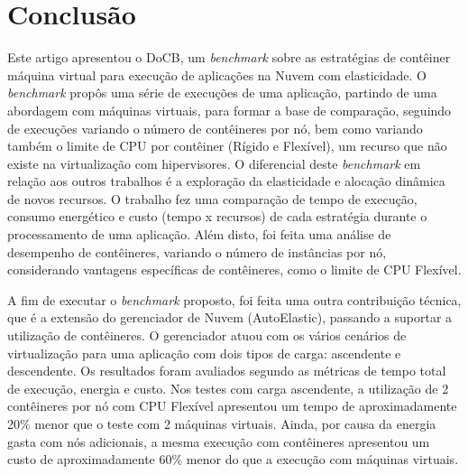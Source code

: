 \documentclass[twoside,english,brazilian]{UNISINOSartigo}
\begin{document}

\section{Conclusão}
\label{conclusion}

Este artigo apresentou o DoCB, um \textit{benchmark} sobre as estratégias de contêiner máquina virtual para execução de aplicações na Nuvem com elasticidade. O \textit{benchmark} propôs uma série de execuções de uma aplicação, partindo de uma abordagem com máquinas virtuais, para formar a base de comparação, seguindo de execuções variando o número de contêineres por nó, bem como variando também o limite de CPU por contêiner (Rígido e Flexível), um recurso que não existe na virtualização com hipervisores. O diferencial deste \textit{benchmark} em relação aos outros trabalhos é a exploração da elasticidade e alocação dinâmica de novos recursos. O trabalho fez uma comparação de tempo de execução, consumo energético e custo (tempo x recursos) de cada estratégia durante o processamento de uma aplicação. Além disto, foi feita uma análise de desempenho de contêineres, variando o número de instâncias por nó, considerando vantagens específicas de contêineres, como o limite de CPU Flexível. 

A fim de executar o \textit{benchmark} proposto, foi feita uma outra contribuição técnica, que é a extensão do gerenciador de Nuvem (AutoElastic), passando a suportar a utilização de contêineres. O gerenciador atuou com os vários cenários de virtualização para uma aplicação com dois tipos de carga: ascendente e descendente. Os resultados foram avaliados segundo as métricas de tempo total de execução, energia e custo. Nos testes com carga ascendente, a utilização de 2 contêineres por nó com CPU Flexível apresentou um tempo de aproximadamente 20\% menor que o teste com 2 máquinas virtuais. Ainda, por causa da energia gasta com nós adicionais, a mesma execução com contêineres apresentou um custo de aproximadamente 60\% menor do que a execução com máquinas virtuais. 
\end{document}
